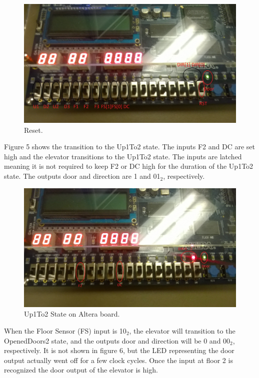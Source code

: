 \documentclass[journal]{IEEEtran}
\begin{document}
\begin{figure}[h]
\centering
\includegraphics[width=0.9\linewidth]{Reset.jpg}
\caption{Reset.}
\label{reset}
\end{figure}

Figure 5 shows the transition to the Up1To2 state. The inputs F2 and DC are set high and the elevator transitions to the Up1To2 state. The inputs are latched meaning it is not required to keep F2 or DC high for the duration of the Up1To2 state. The outputs door and direction are 1 and 01$_{2}$, respectively. 

\begin{figure}[h]
\centering
\includegraphics[width=0.9\linewidth]{Up1To2.jpg}
\caption{Up1To2 State on Altera board.}
\label{up1to2}
\end{figure}

When the Floor Sensor (FS) input is 10$_{2}$, the elevator will transition to the OpenedDoors2 state, and the outputs door and direction will be 0 and 00$_{2}$, respectively. It is not shown in figure 6, but the LED representing the door output actually went off for a few clock cycles. Once the input at floor 2 is recognized the door output of the elevator is high. 
\end{document}
